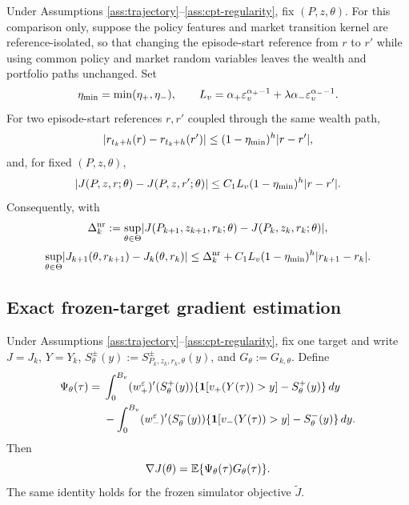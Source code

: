 \begin{proposition}\label{prop:reference-sensitivity}
Under Assumptions \ref{ass:trajectory}--\ref{ass:cpt-regularity}, fix $(P,z,\theta)$.  For this comparison only, suppose the policy features and market transition kernel are reference-isolated, so that changing the episode-start reference from $r$ to $r'$ while using common policy and market random variables leaves the wealth and portfolio paths unchanged.  Set
\begin{equation}\label{eq:reference-constants}
 \eta_{\min}=\min(\eta_{+},\eta_{-}),
 \qquad
 L_v=\alpha_+\varepsilon_v^{\alpha_+-1}
 +\lambda\alpha_-\varepsilon_v^{\alpha_--1}.
\end{equation}
For two episode-start references $r,r'$ coupled through the same wealth path,
\begin{equation}\label{eq:reference-contraction}
 \lvert r_{t_k+h}(r)-r_{t_k+h}(r')\rvert
 \le(1-\eta_{\min})^h\lvert r-r'\rvert,
\end{equation}
and, for fixed $(P,z,\theta)$,
\begin{equation}\label{eq:reference-value-sensitivity}
 \lvert J(P,z,r;\theta)-J(P,z,r';\theta)\rvert
 \le C_1L_v(1-\eta_{\min})^h\lvert r-r'\rvert.
\end{equation}
Consequently, with
\[
 \Delta_k^{\mathrm{nr}}
 :=\sup_{\theta\in\Theta}
 \lvert J(P_{k+1},z_{k+1},r_k;\theta)-J(P_k,z_k,r_k;\theta)\rvert,
\]
\begin{equation}\label{eq:variation-decomposition}
 \sup_{\theta\in\Theta}
 \lvert J_{k+1}(\theta,r_{k+1})-J_k(\theta,r_k)\rvert
 \le \Delta_k^{\mathrm{nr}}
 +C_1L_v(1-\eta_{\min})^h\lvert r_{k+1}-r_k\rvert.
\end{equation}
\end{proposition}

\subsection{Exact frozen-target gradient estimation}

\begin{theorem}\label{thm:gradient-identity}
Under Assumptions \ref{ass:trajectory}--\ref{ass:cpt-regularity}, fix one target and write $J=J_k$, $Y=Y_k$, $S_\theta^\pm(y):=S_{P_k,z_k,r_k,\theta}^\pm(y)$, and $G_\theta:=G_{k,\theta}$.  Define
\begin{align}\label{eq:cpt-multiplier}
 \Psi_\theta(\tau)
 ={}&\int_0^{B_v}(w_+^\varepsilon)'(S_\theta^+(y))
 \{\mathbf 1[v_+(Y(\tau))>y]-S_\theta^+(y)\}\,dy\notag\\
 &-\int_0^{B_v}(w_-^\varepsilon)'(S_\theta^-(y))
 \{\mathbf 1[v_-(Y(\tau))>y]-S_\theta^-(y)\}\,dy.
\end{align}
Then
\begin{equation}\label{eq:score-gradient-identity}
 \nabla J(\theta)=\mathbb E\{\Psi_\theta(\tau)G_\theta(\tau)\}.
\end{equation}
The same identity holds for the frozen simulator objective $\widetilde J$.
\end{theorem}

